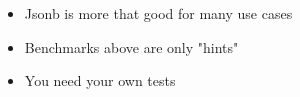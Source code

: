 \documentclass[usenames,dvipsnames, 18pt, compress, aspectratio=169]{beamer}
\begin{document}





\begin{frame}[fragile]
    \frametitle{}
    \vspace{10pt}
    \begin{itemize}[leftmargin=*, label={\MVRightarrow}]
        \item <+-> Jsonb is more that good for many use cases
        \item <+-> Benchmarks above are only "hints"
        \item <+-> You need your own tests
    \end{itemize}
\end{frame}
\end{document}
